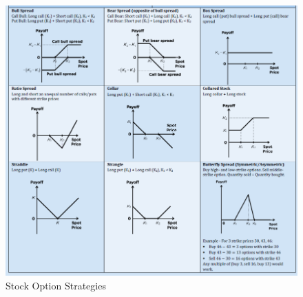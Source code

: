 \documentclass[11pt,fleqn]{report} %
\numberwithin{equation}{section} %
\numberwithin{figure}{section} %
\numberwithin{table}{section} %
\begin{document}
 \begin{center}
     \begin{figure}[h!]
         \centering
         \includegraphics[scale=0.65]{optionstrat.PNG}
         \caption{Stock Option Strategies}
     \end{figure}
 \end{center}
\end{document}
